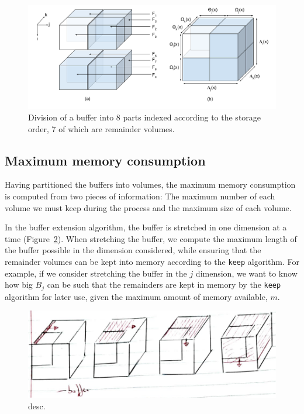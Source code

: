 \documentclass[conference]{IEEEtran}
\begin{document}
\begin{figure}[h]
\centering
\includegraphics[scale=0.4]{./figures/new/nomenclature_overlaps.png}
\caption{Division of a buffer into 8 parts indexed according to the storage
order, 7 of which are remainder volumes.}
\label{fig:nomenclature_overlaps}
\end{figure}

\subsection{Maximum memory consumption}

Having partitioned the buffers into volumes, the maximum memory consumption is
computed from two pieces of information: The maximum number of each volume we
must keep during the process and the maximum size of each volume.

In the buffer extension algorithm, the buffer is stretched in one dimension at
a time (Figure~\ref{fig:bufferextensionalgo}).
When stretching the buffer, we compute the maximum length of the buffer possible
in the dimension considered, while ensuring that the remainder volumes can be
kept into memory according to the \texttt{keep} algorithm. For example, if
we consider stretching the buffer in the $j$ dimension, we want to know how big
$B_j$ can be such that the remainders are kept in memory by the \texttt{keep}
algorithm for later use, given the maximum amount of memory available, $m$.

\begin{figure}[h]
\centering
\includegraphics[scale=0.4]{./figures/new/bufferextensionalgo.png}
\caption{desc.}
\label{fig:bufferextensionalgo}
\end{figure}
\end{document}
